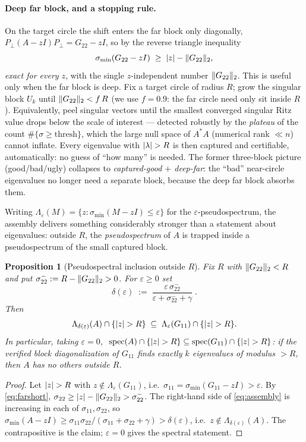 \documentclass[11pt]{article}
\newtheorem{proposition}[theorem]{Proposition}
\newcommand{\spec}{\operatorname{spec}}
\newcommand{\sig}{\sigma}
\newcommand{\sigmin}{\sigma_{\min}}
\DeclarePairedDelimiter{\norm}{\lVert}{\rVert}
\DeclarePairedDelimiter{\abs}{\lvert}{\rvert}
\begin{document}
\paragraph{Deep far block, and a stopping rule.} On the target circle the shift enters the far block
only diagonally, $P_\perp(A-zI)P_\perp=G_{22}-zI$, so by the reverse triangle inequality
\begin{equation}\label{eq:farshort}
  \sigmin(G_{22}-zI)\;\ge\;\abs{z}-\norm{G_{22}}_2,
\end{equation}
\emph{exact for every $z$}, with the single $z$-independent number $\norm{G_{22}}_2$. This is useful
only when the far block is deep. Fix a target circle of radius $R$; grow the singular block $U_k$ until
$\norm{G_{22}}_2<f\,R$ (we use $f=0.9$: the far circle need only sit inside $R$). Equivalently, peel
singular vectors until the smallest converged singular Ritz value drops below the scale of interest ---
detected robustly by the \emph{plateau} of the count $\#\{\sigma\ge\text{thresh}\}$, which the large
null space of $A^*A$ (numerical rank $\ll n$) cannot inflate. Every eigenvalue with $\abs{\lambda}>R$
is then captured and certifiable, automatically: no guess of ``how many'' is needed. The former
three-block picture (good/bad/ugly) collapses to \emph{captured-good $+$ deep-far}: the ``bad''
near-circle eigenvalues no longer need a separate block, because the deep far block absorbs them.

Writing $\Lambda_\varepsilon(M)=\{z:\sigmin(M-zI)\le\varepsilon\}$ for the $\varepsilon$-pseudospectrum,
the assembly delivers something considerably stronger than a statement about eigenvalues: outside $R$,
the \emph{pseudospectrum} of $A$ is trapped inside a pseudospectrum of the small captured block.

\begin{proposition}[Pseudospectral inclusion outside $R$]\label{prop:complete}
Fix $R$ with $\norm{G_{22}}_2<R$ and put $\sig_{22}^-:=R-\norm{G_{22}}_2>0$. For $\varepsilon\ge0$ set
\[
  \delta(\varepsilon)\;:=\;\frac{\varepsilon\,\sig_{22}^-}{\varepsilon+\sig_{22}^-+\gamma}\;.
\]
Then
\[
  \Lambda_{\delta(\varepsilon)}(A)\cap\{\abs{z}>R\}\;\subseteq\;\Lambda_{\varepsilon}(G_{11})\cap\{\abs{z}>R\}.
\]
In particular, taking $\varepsilon=0$, $\ \spec(A)\cap\{\abs{z}>R\}\subseteq\spec(G_{11})\cap\{\abs{z}>R\}$:
if the verified block diagonalization of $G_{11}$ finds exactly $k$ eigenvalues of modulus $>R$, then
$A$ has \emph{no others} outside $R$.
\end{proposition}
\begin{proof}
Let $\abs{z}>R$ with $z\notin\Lambda_\varepsilon(G_{11})$, i.e.\ $\sig_{11}=\sigmin(G_{11}-zI)>\varepsilon$.
By \eqref{eq:farshort}, $\sig_{22}\ge\abs{z}-\norm{G_{22}}_2>\sig_{22}^-$. The right-hand side of
\eqref{eq:assembly} is increasing in each of $\sig_{11},\sig_{22}$, so
$\sigmin(A-zI)\ge\sig_{11}\sig_{22}/(\sig_{11}+\sig_{22}+\gamma)>\delta(\varepsilon)$, i.e.\
$z\notin\Lambda_{\delta(\varepsilon)}(A)$. The contrapositive is the claim; $\varepsilon=0$ gives the
spectral statement.
\end{proof}
\end{document}
